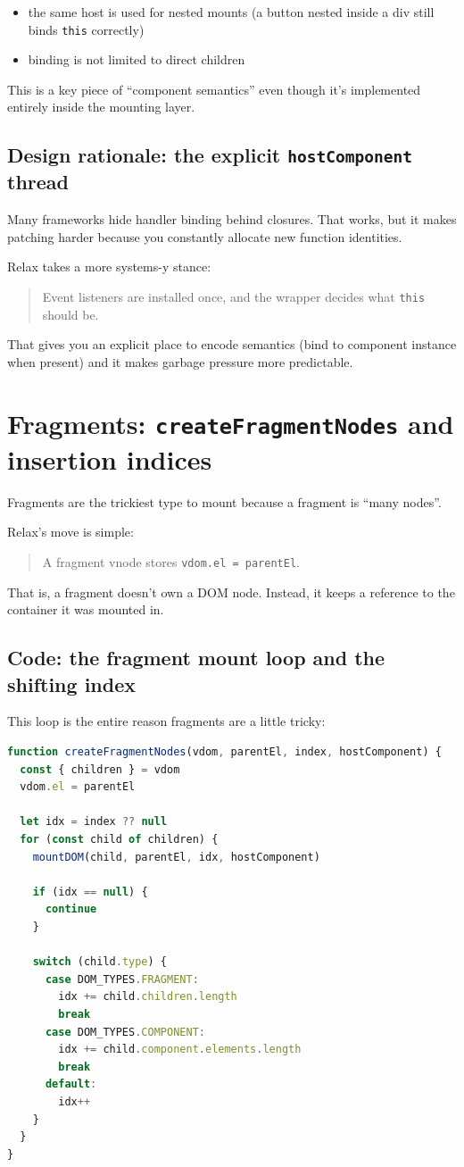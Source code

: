 \begin{itemize}
  \item the same host is used for nested mounts (a button nested inside a div still binds \texttt{this} correctly)
  \item binding is not limited to direct children
\end{itemize}

This is a key piece of ``component semantics'' even though it's implemented entirely inside the mounting layer.

\subsection*{Design rationale: the explicit \texttt{hostComponent} thread}
Many frameworks hide handler binding behind closures.
That works, but it makes patching harder because you constantly allocate new function identities.

Relax takes a more systems-y stance:

\begin{quote}
  Event listeners are installed once, and the wrapper decides what \texttt{this} should be.
\end{quote}

That gives you an explicit place to encode semantics (bind to component instance when present) and it makes garbage pressure more predictable.

\section{Fragments: \texttt{createFragmentNodes} and insertion indices}
Fragments are the trickiest type to mount because a fragment is ``many nodes''.

Relax's move is simple:

\begin{quote}
  A fragment vnode stores \texttt{vdom.el = parentEl}.
\end{quote}

That is, a fragment doesn't own a DOM node. Instead, it keeps a reference to the container it was mounted in.

\subsection*{Code: the fragment mount loop and the shifting index}
This loop is the entire reason fragments are a little tricky:

\begin{lstlisting}[language=JavaScript]
function createFragmentNodes(vdom, parentEl, index, hostComponent) {
  const { children } = vdom
  vdom.el = parentEl

  let idx = index ?? null
  for (const child of children) {
    mountDOM(child, parentEl, idx, hostComponent)

    if (idx == null) {
      continue
    }

    switch (child.type) {
      case DOM_TYPES.FRAGMENT:
        idx += child.children.length
        break
      case DOM_TYPES.COMPONENT:
        idx += child.component.elements.length
        break
      default:
        idx++
    }
  }
}
\end{lstlisting}

